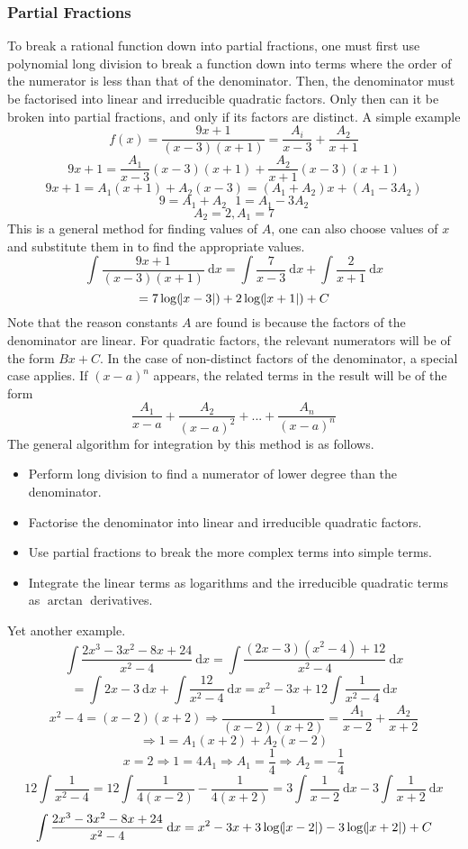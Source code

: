 \documentclass[12pt]{report}
\newcommand{\dx}{\:\mathrm{d}x}
\begin{document}
\begin{flushleft}
\subsubsection*{Partial Fractions}
To break a rational function down into partial fractions, one must first use
polynomial long division to break a function down into terms where the order of
the numerator is less than that of the denominator. Then, the denominator must 
be factorised into linear and irreducible quadratic factors. Only then can it 
be broken into partial fractions, and only if its factors are distinct. A 
simple example
\[f(x) = \frac{9x + 1}{(x - 3)(x + 1)} = \frac{A_i}{x - 3}+\frac{A_2}{x + 1}\]
\[9x + 1 = \frac{A_1}{x - 3}(x - 3)(x + 1) + \frac{A_2}{x + 1}(x - 3)(x + 1)\]
\[9x + 1 = A_1(x + 1) + A_2(x - 3) = (A_1 + A_2)x + (A_1 - 3A_2)\]
\[9 = A_1 + A_2 \:\:\: 1 = A_1 - 3A_2\]
\[A_2 = 2, A_1 = 7\]
This is a general method for finding values of \(A\), one can also choose
values of \(x\) and substitute them in to find the appropriate values.
\[\int \frac{9x + 1}{(x - 3)(x + 1)} \dx = \int \frac{7}{x - 3} \dx +
\int \frac{2}{x + 1} \dx\]
\[= 7\log(\abs{x - 3}) + 2\log(\abs{x + 1}) + C\]
Note that the reason constants \(A\) are found is because the factors of the
denominator are linear. For quadratic factors, the relevant numerators will be
of the form \(Bx + C\). In the case of non-distinct factors of the denominator,
a special case applies. If \((x - a)^n\) appears, the related terms in the 
result will be of the form
\[\frac{A_1}{x - a} + \frac{A_2}{(x - a)^2} + ... + \frac{A_n}{(x - a)^n}\]
The general algorithm for integration by this method is as follows.
\begin{itemize}
    \item Perform long division to find a numerator of lower degree than the
    denominator.
    \item Factorise the denominator into linear and irreducible quadratic 
    factors.
    \item Use partial fractions to break the more complex terms into simple
    terms.
    \item Integrate the linear terms as logarithms and the irreducible 
    quadratic terms as \(\arctan\) derivatives.
\end{itemize}
Yet another example.
\[\int \frac{2x^3 - 3x^2 - 8x + 24}{x^2 - 4} \dx 
= \int \frac{(2x - 3)(x^2 - 4) + 12}{x^2 - 4} \dx\]
\[= \int 2x - 3 \dx + \int \frac{12}{x^2 - 4} \dx 
= x^2 - 3x + 12\int \frac{1}{x^2 - 4} \dx\]
\[x^2 - 4 = (x - 2)(x + 2) \Rightarrow 
\frac{1}{(x - 2)(x + 2)} = \frac{A_1}{x - 2} + \frac{A_2}{x + 2}\]
\[\Rightarrow 1 = A_1(x + 2) + A_2(x - 2)\]
\[x = 2 \Rightarrow 1 = 4A_1 \Rightarrow A_1 = \frac{1}{4} \Rightarrow A_2 
= -\frac{1}{4}\]
\[12\int \frac{1}{x^2 - 4} = 12\int \frac{1}{4(x - 2)} - \frac{1}{4(x + 2)}
= 3\int  \frac{1}{x - 2} \dx - 3\int \frac{1}{x + 2} \dx\]
\[\int \frac{2x^3 - 3x^2 - 8x + 24}{x^2 - 4} \dx 
= x^2 - 3x + 3\log(\abs{x - 2}) - 3\log(\abs{x + 2}) + C\]


\end{flushleft}
\end{document}
